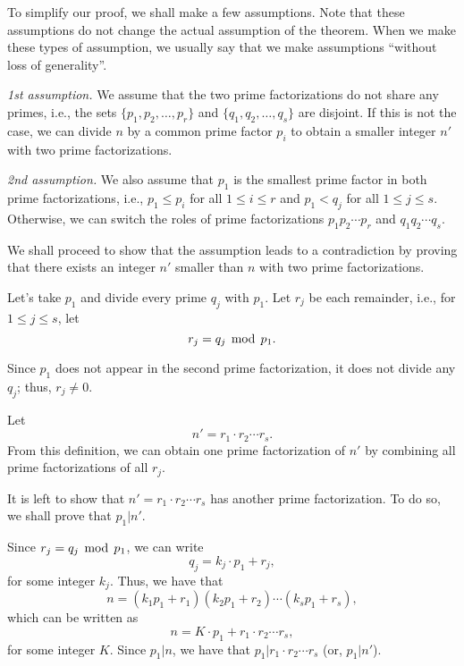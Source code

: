 \begin{frame}
  \begin{tcolorbox}[title=Proof (cont.)]
  To simplify our proof, we shall make a few assumptions.  Note that
  these assumptions do not change the actual assumption of the
  theorem.  When we make these types of assumption, we usually say
  that we make assumptions ``without loss of generality''.

  \vspace{0.1in} {\em 1st assumption.} We assume that the two prime
  factorizations do not share any primes, i.e., the sets
  $\{p_1,p_2,\ldots,p_r\}$ and $\{q_1,q_2,\ldots,q_s\}$ are disjoint.
  If this is not the case, we can divide $n$ by a common prime factor
  $p_i$ to obtain a smaller integer $n'$ with two prime
  factorizations.

  \vspace{0.1in} {\em 2nd assumption.} We also assume that $p_1$ is
  the smallest prime factor in both prime factorizations, i.e.,
  $p_1\leq p_i$ for all $1\leq i\leq r$ and $p_1 < q_j$ for all $1\leq
  j\leq s$.  Otherwise, we can switch the roles of prime
  factorizations $p_1p_2\cdots p_r$ and $q_1q_2\cdots q_s$.
  \end{tcolorbox}
\end{frame}

\begin{frame}
  \begin{tcolorbox}[title=Proof (cont.)]
  We shall proceed to show that the assumption leads to a
  contradiction by proving that there exists an integer $n'$ smaller
  than $n$ with two prime factorizations.

  Let's take $p_1$ and divide every prime $q_j$ with $p_1$.  Let $r_j$
  be each remainder, i.e., for $1\leq j\leq s$, let
  \[ r_j=q_j \,\bmod\, p_1.\]

  Since $p_1$ does not appear in the second prime factorization, it
  does not divide any $q_j$; thus, $r_j\neq 0$.
  
  Let
  \[ n' = r_1\cdot r_2\cdots r_s.\]
  From this definition, we can obtain one prime factorization of $n'$
  by combining all prime factorizations of all $r_j$.
  \end{tcolorbox}
\end{frame}

\begin{frame}
  \begin{tcolorbox}[title=Proof (cont.)]
  It is left to show that $n'=r_1\cdot r_2\cdots r_s$ has another
  prime factorization.  To do so, we shall prove that $p_1|n'$.

  \vspace{0.1in}
  Since $r_j=q_j\,\bmod\, p_1$, we can write
  \[ q_j=k_j\cdot p_1 + r_j, \]
  for some integer $k_j$.  Thus, we have that
  \[ n = (k_1p_1+r_1)(k_2p_1+r_2)\cdots(k_sp_1+r_s), \]
  which can be written as
  \[ n = K\cdot p_1 + r_1\cdot r_2\cdots r_s, \]
  for some integer $K$.  Since $p_1|n$, we have that $p_1|r_1\cdot
  r_2\cdots r_s$ (or, $p_1|n'$).
  \end{tcolorbox}
\end{frame}

